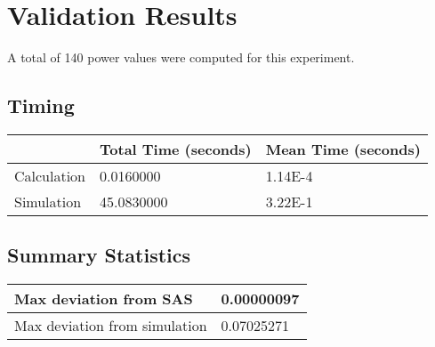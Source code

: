 \documentclass{glimmpse-report}
\begin{document}
\section{Validation Results}
A total of 140 power values were computed for this experiment.

\subsection{Timing}
\begin{tabular}{|l|l|l|}
\hline
 & Total Time (seconds) & Mean Time (seconds) \\ 
\hline
Calculation & 0.0160000 & 1.14E-4\tabularnewline
\hline
Simulation & 45.0830000 & 3.22E-1\tabularnewline
\hline
\end{tabular}
\subsection{Summary Statistics}
\begin{tabular}{|l|l|}
\hline
Max deviation from SAS & 0.00000097\tabularnewline
\hline

Max deviation from simulation & 0.07025271\tabularnewline
\hline

\end{tabular}
\end{document}
